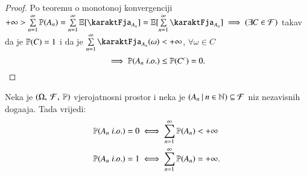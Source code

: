\begin{proof}
    Po teoremu o monotonoj konvergenciji
    $+\infty > \suma{n = 1}{\infty} \vjeroj{A_n} = \suma{n = 1}{\infty} \masE [ \karaktFja_{A_n} ] = \masE [\suma{n = 1}{\infty} \karaktFja_{A_n}] \implies (\exists C \in \famF)$ takav da je $\mathbb{P}({C}) = 1$ i da je $\suma{n = 1}{\infty} \karaktFja_{A_n}(\omega) < +\infty$, $\forall \omega \in C$
    \begin{equation*}
        \implies \mathbb{P}({A_n \; i.o.}) \leq \mathbb{P}({C^c}) = 0. 
    \end{equation*}
\end{proof}

\begin{tm}   \label{tm:9.3}
    Neka je $(\Omega, \: \mathcal{F}, \: \mathbb{P})$ vjerojatnosni prostor i neka je $({A_n} \: | \: {n \in \mathbb{N}}) \subseteq \mathcal{F}$ niz nezavisnih doga\dj aja.
    Tada vrijedi:
    \begin{equation*}
        \begin{aligned}
            \mathbb{P}({A_n \; i.o.}) = 0 &\iff \sum\limits_{n = 1}^{\infty} \mathbb{P}({A_n}) < +\infty\\
            \mathbb{P}({A_n \; i.o.}) = 1 &\iff \sum\limits_{n = 1}^{\infty} \mathbb{P}({A_n}) = +\infty.
        \end{aligned}
    \end{equation*}
\end{tm}